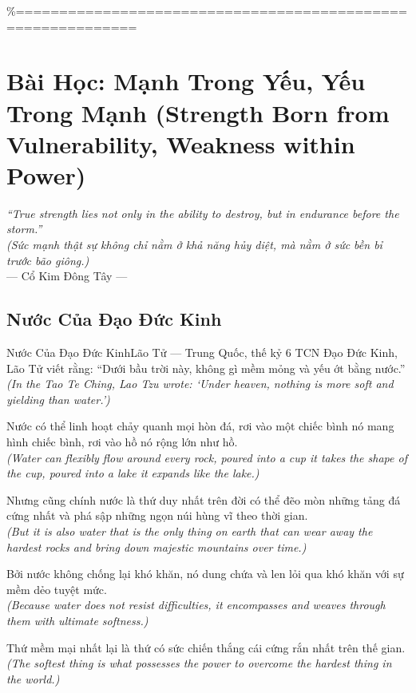\%============================================================
\chapter{Bài Học: Mạnh Trong Yếu, Yếu Trong Mạnh (Strength Born from Vulnerability, Weakness within Power)}
\begin{center}
  \textit{\color{truyengold}``True strength lies not only in the ability to destroy, but in endurance before the storm.''}\\[4pt]
  \textit{(Sức mạnh thật sự không chỉ nằm ở khả năng hủy diệt, mà nằm ở sức bền bỉ trước bão giông.)}\\[4pt]
  \small\color{truyenblue}--- Cổ Kim Đông Tây ---
\end{center}
\ngancach

\section{Nước Của Đạo Đức Kinh}
\begin{truyen}{Nước Của Đạo Đức Kinh}{Lão Tử --- Trung Quốc, thế kỷ 6 TCN}
 Đạo Đức Kinh, Lão Tử viết rằng: ``Dưới bầu trời này, không gì mềm mỏng và yếu ớt bằng nước.''\\[4pt]
\textit{(In the Tao Te Ching, Lao Tzu wrote: `Under heaven, nothing is more soft and yielding than water.')}

Nước có thể linh hoạt chảy quanh mọi hòn đá, rơi vào một chiếc bình nó mang hình chiếc bình, rơi vào hồ nó rộng lớn như hồ.\\[4pt]
\textit{(Water can flexibly flow around every rock, poured into a cup it takes the shape of the cup, poured into a lake it expands like the lake.)}

Nhưng cũng chính nước là thứ duy nhất trên đời có thể đẽo mòn những tảng đá cứng nhất và phá sập những ngọn núi hùng vĩ theo thời gian.\\[4pt]
\textit{(But it is also water that is the only thing on earth that can wear away the hardest rocks and bring down majestic mountains over time.)}

Bởi nước không chống lại khó khăn, nó dung chứa và len lỏi qua khó khăn với sự mềm dẻo tuyệt mức.\\[4pt]
\textit{(Because water does not resist difficulties, it encompasses and weaves through them with ultimate softness.)}

\end{truyen}
\begin{baihoc}
  Thứ mềm mại nhất lại là thứ có sức chiến thắng cái cứng rắn nhất trên thế gian.\\[4pt]
  \textit{(The softest thing is what possesses the power to overcome the hardest thing in the world.)}
\end{baihoc}

